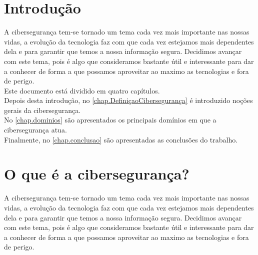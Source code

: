 \documentclass{report}
\begin{document}
\tableofcontents


\clearpage
{}

\chapter{Introdução}
\label{chap.introducao}
A cibersegurança tem-se tornado um tema cada vez mais importante nas nossas vidas, a evolução da tecnologia faz com que cada vez estejamos mais dependentes dela e para garantir que temos a nossa informação segura. Decidimos avançar com este tema, pois é algo que consideramos bastante útil e interessante para dar a conhecer de forma a que possamos aproveitar ao maximo as tecnologias e fora de perigo.\\

Este documento está dividido em quatro capítulos.\\
Depois desta introdução,
no \autoref{chap.DefiniçaoCibersegurança} é introduzido noções gerais da cibersegurança.\\
No \autoref{chap.dominios} são apresentados os principais domínios em que a cibersegurança atua.\\
Finalmente, no \autoref{chap.conclusao} são apresentadas
as conclusões do trabalho.

\chapter{O que é a cibersegurança?}
\cite{DefCyber}
\cite{cisco}
\label{chap.DefiniçaoCibersegurança}
A cibersegurança tem-se tornado um tema cada vez mais importante nas nossas vidas, a evolução da tecnologia faz com que cada vez estejamos mais dependentes dela e para garantir que temos a nossa informação segura. Decidimos avançar com este tema, pois é algo que consideramos bastante útil e interessante para dar a conhecer de forma a que possamos aproveitar ao maximo as tecnologias e fora de perigo.
\end{document}
